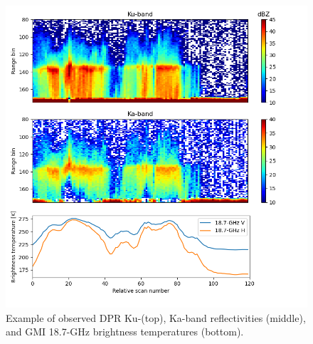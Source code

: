 \documentclass[10pt]{ietbook}
\begin{document}
\begin{figure} \label{fig:dataEx}
    \centerline{ }
    \includegraphics[width=\textwidth]{kwajObs.20150311-S162503-E162626.005866.png}
    
    \caption{Example of observed DPR Ku-(top), Ka-band reflectivities (middle), and GMI 18.7-GHz brightness temperatures (bottom).}
\end{figure}
\end{document}
